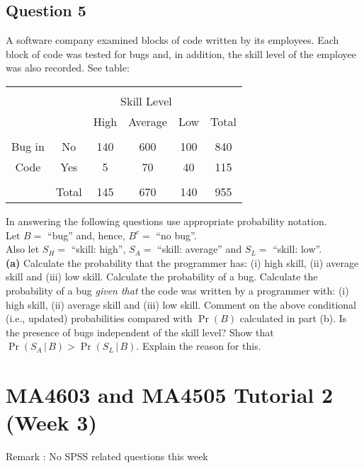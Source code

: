 
\subsection*{Question 5}
A software company examined blocks of code written by its employees. Each block of code was tested for bugs and, in addition, the skill level of the employee was also recorded. See table:
\begin{center}
\begin{tabular}{|cc|ccc|c|}
\hline
&&&&&\\[-0.4cm]
&& \multicolumn{3}{|c|}{Skill Level} &  \\
&& High & Average & Low & Total \\
\hline
&&&&&\\[-0.4cm]
Bug in   & No    &  140 &   600  & 100 & 840 \\
Code & Yes   &    5 &    70  &  40 & 115 \\
\hline
&&&&&\\[-0.4cm]
&Total &  145 &   670  & 140 & 955 \\
\hline
\end{tabular}
\end{center}
In answering the following questions use appropriate probability notation.\\[0.2cm]
Let $B =$ ``bug'' and, hence, $B^c =$ ``no bug''.\\[0.1cm]
Also let $S_H = $ ``skill: high'', $S_A = $ ``skill: average'' and $S_L =$ ``skill: low''.\\[-0.2cm]

{\bf(a)} Calculate the probability that the programmer has: (i) high skill, (ii) average skill and (iii) low skill.  Calculate the probability of a bug.  Calculate the probability of a bug \emph{given that} the code was written by a programmer with: (i) high skill, (ii) average skill and (iii) low skill.  Comment on the above conditional (i.e., updated) probabilities compared with $\Pr(B)$ calculated in part (b). Is the presence of bugs independent of the skill level?  Show that $\Pr(S_A\,|\,B) > \Pr(S_L\,|\,B)$. Explain the reason for this.

\newpage
\section*{MA4603 and MA4505 Tutorial 2 (Week 3)}
Remark : No SPSS related questions this week 

